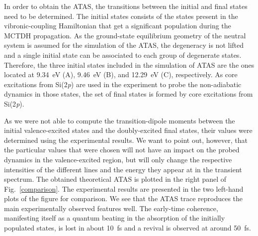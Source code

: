 \documentclass[12pt]{article}
\begin{document}
In order to obtain the ATAS, the transitions between the initial and final states need to be determined. The initial states consists of the states present in the vibronic-coupling Hamiltonian that get a significant population during the MCTDH propagation. As the ground-state equilibrium geometry of the neutral system is assumed for the simulation of the ATAS, the degeneracy is not lifted and a single initial state can be associated to each group of degenerate states. Therefore, the three initial states included in the simulation of ATAS are the ones located at 9.34~eV (A), 9.46~eV (B), and 12.29~eV (C), respectively. As core excitations from Si(2\textit{p}) are used in the experiment to probe the non-adiabatic dynamics in those states, the set of final states is formed by core excitations from Si(2\textit{p}). %



As we were not able to compute the transition-dipole moments between the initial valence-excited states and the doubly-excited final states, their values were determined using the experimental results. We want to point out, however, that the particular values that were chosen will not have an impact on the probed dynamics in the valence-excited region, but will only change the respective intensities of the different lines and the energy they appear at in the transient spectrum. The obtained theoretical ATAS is plotted in the right panel of Fig.~\ref{comparison}. The experimental results are presented in the two left-hand plots of the figure for comparison. We see that the ATAS trace reproduces the main experimentally observed features well. The early-time coherence, manifesting itself as a quantum beating in the absorption of the initially populated states, is lost in about 10~fs and a revival is observed at around 50~fs. 
\end{document}
